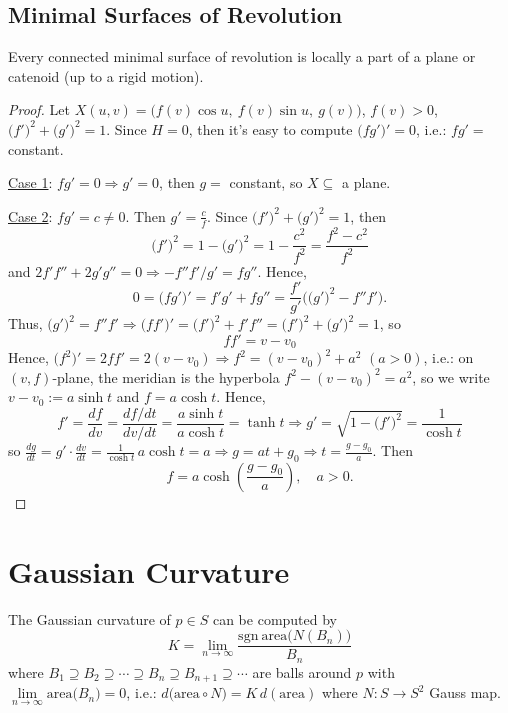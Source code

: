 \subsection{Minimal Surfaces of Revolution}

\begin{theorem}
    Every connected minimal surface of revolution is locally a part of a plane or catenoid (up to a rigid motion).
\end{theorem}


\begin{proof}
Let $X(u, v) = \big(f(v)\cos u,\ f(v)\sin u,\ g(v)\big)$, $f(v) > 0$, $\big(f'\big)^2 + \big(g'\big)^2 = 1$. Since $H = 0$, then it's easy to compute $\big(fg'\big)' = 0$, i.e.: $fg' = $ constant.

\noindent\underline{Case 1}: $fg' = 0 \Rightarrow g' = 0$, then $g = $ constant, so $X\subseteq$ a plane.

\noindent\underline{Case 2}: $fg' = c\neq 0$. Then $g' = \frac{c}{f}$. Since $\big(f'\big)^2 + \big(g'\big)^2 = 1$, then
\[
\big(f'\big)^2 = 1 - \big(g'\big)^2 = 1 - \frac{c^2}{f^2} = \frac{f^2 - c^2}{f^2} 
\]
and $2f'f'' + 2g'g'' = 0 \Rightarrow -f''f'/g' = fg''$. Hence,
\[
0 = \big(fg'\big)' = f'g' + fg'' = \frac{f'}{g'}\Big(\big(g'\big)^2 - f''f'\Big).
\]
Thus, $\big(g'\big)^2 = f''f' \Rightarrow \big(ff'\big)' = \big(f'\big)^2 + f'f'' = \big(f'\big)^2 + \big(g'\big)^2 = 1$, so
\[
ff' = v - v_0
\]
Hence, $\big(f^2\big)' = 2ff' = 2(v - v_0) \Rightarrow f^2 = (v - v_0)^2 + a^2$ $(a > 0)$, i.e.: on $(v, f)$-plane, the meridian is the hyperbola $f^2 - (v - v_0)^2 = a^2$, so we write $v - v_0 := a\sinh t$ and $f = a\cosh t$. Hence,
\[
f' = \frac{df}{dv} = \frac{df/dt}{dv/dt} = \frac{a\sinh t}{a\cosh t} = \tanh t \Rightarrow g' = \sqrt{1 - \big(f'\big)^2} = \frac{1}{\cosh t}
\]
so $\frac{dg}{dt} = g'\cdot\frac{dv}{dt} = \frac{1}{\cosh t}\,a\cosh t = a \Rightarrow g = at + g_0 \Rightarrow t = \frac{g - g_0}{a}$. Then
\[
f = a\cosh\left(\frac{g - g_0}{a}\right), \quad a > 0.
\]
\end{proof}

\section{Gaussian Curvature}

\begin{theorem}
The Gaussian curvature of $p\in S$ can be computed by
\[
K = \lim_{n\to\infty}\frac{\mathrm{sgn\ area}\big(N(B_n)\big)}{B_n}
\]
where $B_1 \supseteq B_2 \supseteq \cdots \supseteq B_n \supseteq B_{n + 1} \supseteq \cdots$ are balls around $p$ with $\lim\limits_{n\to\infty}\mathrm{area}\big(B_n\big) = 0$, i.e.: $d\big(\mathrm{area}\circ N\big) = K\,d(\mathrm{area})$ where $N: S\to S^2$ Gauss map.
\end{theorem}

